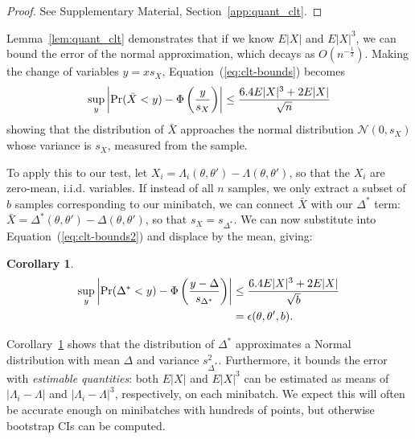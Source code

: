 \documentclass[twoside]{article} \usepackage{aistats2017}
\newtheorem{corollary}{Corollary}
\begin{document}
\begin{proof}
See Supplementary Material, Section~\ref{app:quant_clt}.
\end{proof}



Lemma~\ref{lem:quant_clt} demonstrates that if we know $E|X|$ and $E|X|^3$, we
can bound the error of the normal approximation, which decays as
$O(n^{-\frac{1}{2}})$. Making the change of variables $y = x s_X$,
Equation~(\ref{eq:clt-bounds}) becomes
\begin{equation}\label{eq:clt-bounds2}
   \sup_y\left|{\rm Pr}(\bar{X}< y) - \Phi\left(\frac{y}{s_X}\right)\right| \leq \frac{6.4E|X|^3+2E|X|}{\sqrt{n}}
\end{equation}
showing that the distribution of $\bar{X}$ approaches the normal distribution
$\mathcal{N}(0,s_X)$ whose variance is $s_X$,
measured from the sample.

To apply this to our test, let $X_i = \Lambda_i(\theta,\theta') -
\Lambda(\theta,\theta')$, so that the $X_i$ are zero-mean, i.i.d. variables. If
instead of all $n$ samples, we only extract a subset of $b$ samples
corresponding to our minibatch, we can connect $\bar{X}$ with our $\Delta^*$
term: $\bar{X} = \Delta^*(\theta,\theta') - \Delta(\theta,\theta')$, so that
$s_X = s_{\Delta^*}$. We can now substitute into Equation~(\ref{eq:clt-bounds2}) and displace by the mean, giving:


\begin{corollary}\label{cor:our_bound_delta_prime}
\begin{align*}
    \sup_y\left|{\rm Pr}(\Delta^*< y) - \Phi\left(\frac{y-\Delta}{s_{\Delta^*}}\right)\right| &\leq \frac{6.4E|X|^3+2E|X|}{\sqrt{b}} \\
    &= \epsilon(\theta,\theta',b).
\end{align*}
\end{corollary} %
Corollary~\ref{cor:our_bound_delta_prime} shows that the distribution of
$\Delta^*$ approximates a Normal distribution with mean $\Delta$ and variance
$s^2_{\Delta^*}$. Furthermore, it bounds the error with \emph{estimable
quantities}: both $E|X|$ and $E|X|^3$ can be estimated as means of $|\Lambda_i
- \Lambda|$ and $|\Lambda_i - \Lambda|^3$, respectively, on each minibatch. We
expect this will often be accurate enough on minibatches with hundreds of
points, but otherwise bootstrap CIs can be computed.
\end{document}
